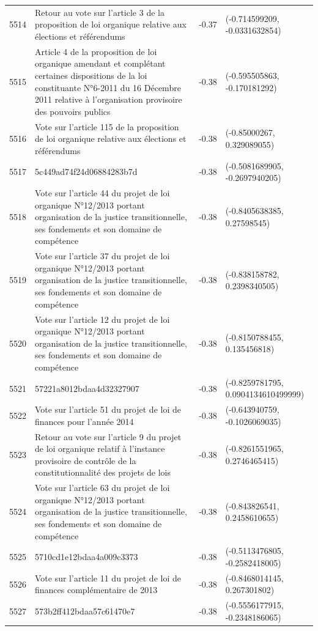 \begin{table}[ht]
\begin{tabular}{rlrl}
  5514 & Retour au vote sur l'article 3 de la proposition de loi organique relative aux élections et référendums & -0.37 & (-0.714599209, -0.0331632854) \\ 
  5515 & Article 4 de la proposition de loi organique amendant et complétant certaines dispositions de la loi constituante N°6-2011 du 16 Décembre 2011 relative à l'organisation provisoire des pouvoirs publics & -0.38 & (-0.595505863, -0.170181292) \\ 
  5516 & Vote sur l'article 115 de la proposition de loi organique relative aux élections et référendums & -0.38 & (-0.85000267, 0.329089055) \\ 
  5517 & 5c449ad74f24d06884283b7d & -0.38 & (-0.5081689905, -0.2697940205) \\ 
  5518 & Vote sur l'article 44 du projet de loi organique N°12/2013 portant organisation de la justice transitionnelle, ses fondements et son domaine de compétence & -0.38 & (-0.8405638385, 0.27598545) \\ 
  5519 & Vote sur l'article 37 du projet de loi organique N°12/2013 portant organisation de la justice transitionnelle, ses fondements et son domaine de compétence & -0.38 & (-0.838158782, 0.2398340505) \\ 
  5520 & Vote sur l'article 12 du projet de loi organique N°12/2013 portant organisation de la justice transitionnelle, ses fondements et son domaine de compétence & -0.38 & (-0.8150788455, 0.135456818) \\ 
  5521 & 57221a8012bdaa4d32327907 & -0.38 & (-0.8259781795, 0.0904134610499999) \\ 
  5522 & Vote sur l'article 51 du projet de loi de finances pour l'année 2014 & -0.38 & (-0.643940759, -0.1026069035) \\ 
  5523 & Retour au vote sur l'article 9 du projet de loi organique relatif à l'instance provisoire de contrôle de la constitutionnalité des projets de lois & -0.38 & (-0.8261551965, 0.2746465415) \\ 
  5524 & Vote sur l'article 63 du projet de loi organique N°12/2013 portant organisation de la justice transitionnelle, ses fondements et son domaine de compétence & -0.38 & (-0.843826541, 0.2458610655) \\ 
  5525 & 5710cd1e12bdaa4a009c3373 & -0.38 & (-0.5113476805, -0.2582418005) \\ 
  5526 & Vote sur l'article 11 du projet de loi de finances complémentaire de 2013 & -0.38 & (-0.8468014145, 0.267301802) \\ 
  5527 & 573b2ff412bdaa57c61470e7 & -0.38 & (-0.5556177915, -0.2348186065) \\ 

\end{tabular}
\end{table}
